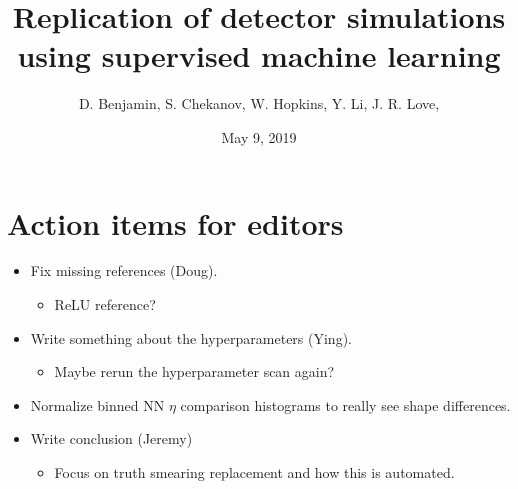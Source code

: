 \documentclass[showpacs,showkeys,preprint,prd,nofootinbib,linenumbers,12pt]{revtex4-1}
\begin{document}


\date{May 9, 2019}

\vspace{2.5cm}

\title{
  Replication of detector simulations using supervised machine learning 
}


\author{D. Benjamin, S. Chekanov, W. Hopkins, Y. Li, J. R. Love,}
% 



\begin{abstract}

\end{abstract}


\maketitle

\section{Action items for editors}
\begin{itemize}
\item Fix missing references (Doug).
  \begin{itemize}
  \item ReLU reference?
  \end{itemize}
\item Write something about the hyperparameters (Ying).
  \begin{itemize}
  \item Maybe rerun the hyperparameter scan again?
  \end{itemize}
\item Normalize binned NN $\eta$ comparison histograms to really see shape differences. 
\item Write conclusion (Jeremy)
  \begin{itemize}
  \item Focus on truth smearing replacement and how this is automated.
  \end{itemize}

\end{itemize}
\end{document}
